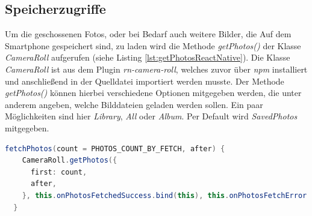 \subsection*{Speicherzugriffe}

Um die geschossenen Fotos, oder bei Bedarf auch weitere Bilder, die Auf dem Smartphone gespeichert sind, zu laden wird die Methode \textit{getPhotos()} der Klasse \textit{CameraRoll} aufgerufen (siehe Listing \ref{lst:getPhotosReactNative}). Die Klasse \textit{CameraRoll} ist aus dem Plugin \textit{rn-camera-roll}, welches zuvor über \textit{npm} installiert und anschließend in der Quelldatei importiert werden musste. Der Methode \textit{getPhotos()} können hierbei verschiedene Optionen mitgegeben werden, die unter anderem angeben, welche Bilddateien geladen werden sollen. Ein paar Möglichkeiten sind hier \textit{Library}, \textit{All} oder \textit{Album}. Per Default wird \textit{SavedPhotos} mitgegeben. 
\clearpage

\begin{lstlisting}[caption=Aufruf der Methode \textit{getPhotos()} für die Anzeige gespeicherter Bilder in einer Galerie, label=lst:getPhotosReactNative, language=Java]
fetchPhotos(count = PHOTOS_COUNT_BY_FETCH, after) {
    CameraRoll.getPhotos({
      first: count,
      after,
    }, this.onPhotosFetchedSuccess.bind(this), this.onPhotosFetchError.bind(this));
  }
\end{lstlisting} 